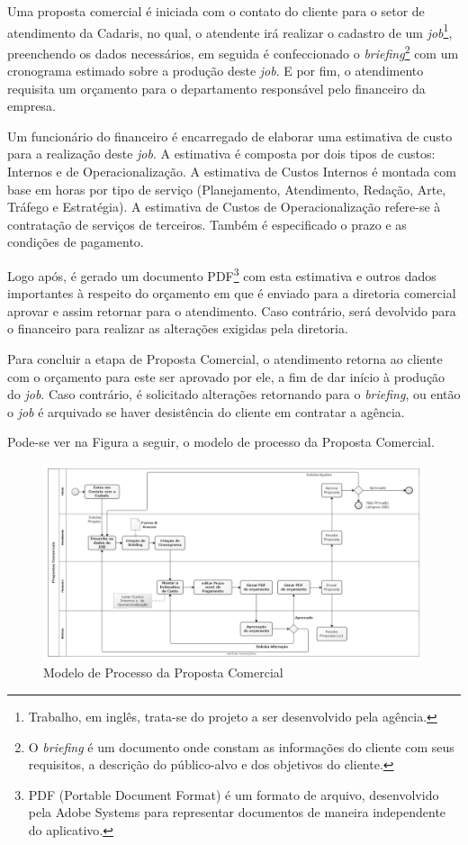 \documentclass[
  12pt,				%
  openany,
  oneside,
  a4paper,			%
  english,			%
  brazil
]{article}
\numberwithin{figure}{section}
\numberwithin{table}{section}
\begin{document}
Uma proposta comercial é iniciada com o contato do cliente para o setor de atendimento da Cadaris, no qual, o atendente irá realizar o cadastro de um \textit{job}\footnote{Trabalho, em inglês, trata-se do projeto a ser desenvolvido pela agência.}, preenchendo os dados necessários, em seguida é confeccionado o \textit{briefing}\footnote{O \textit{briefing} é um documento onde constam as informações do cliente com seus requisitos, a descrição do público-alvo e dos objetivos do cliente.} com um cronograma estimado sobre a produção deste \textit{job}. E por fim, o atendimento requisita um orçamento para o departamento responsável pelo financeiro da empresa.

Um funcionário do financeiro é encarregado de elaborar uma estimativa de custo para a realização deste \textit{job}. A estimativa é composta por dois tipos de custos: Internos e de Operacionalização. A estimativa de Custos Internos é montada com base em horas por tipo de serviço (Planejamento, Atendimento, Redação, Arte, Tráfego e Estratégia). A estimativa de Custos de Operacionalização refere-se à contratação de serviços de terceiros. Também é especificado o prazo e as condições de pagamento.

Logo após, é gerado um documento PDF\footnote{PDF (Portable Document Format) é um formato de arquivo, desenvolvido pela Adobe Systems para representar documentos de maneira independente do aplicativo.} com esta estimativa e outros dados importantes à respeito do orçamento em que é enviado para a diretoria comercial aprovar e assim retornar para o atendimento. Caso contrário, será devolvido para o financeiro para realizar as alterações exigidas pela diretoria.

Para concluir a etapa de Proposta Comercial, o atendimento retorna ao cliente com o orçamento para este ser aprovado por ele, a fim de dar início à produção do \textit{job}. Caso contrário, é solicitado alterações retornando para o \textit{briefing}, ou então o \textit{job} é arquivado se haver desistência do cliente em contratar a agência.

Pode-se ver na Figura a seguir, o modelo de processo da Proposta Comercial.

\begin{figure}[h]
  \centering
  \includegraphics[width=\linewidth]{ModeloProcesso_Comercial_PeB}
  \caption{Modelo de Processo da Proposta Comercial}
  \label{fig:modProcess}
\end{figure}
\end{document}
